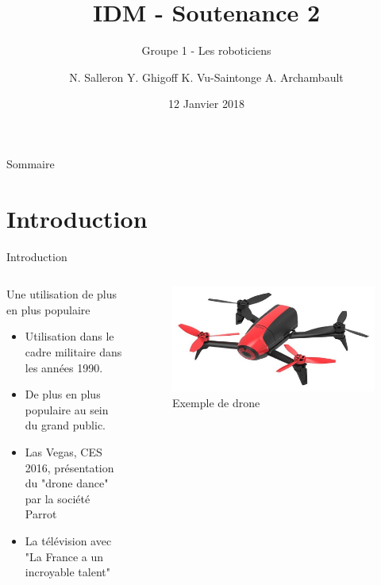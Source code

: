 \documentclass{bredelebeamer}
\title[Ingéniere dirigée par les Modéles]{IDM - Soutenance 2}
\subtitle{Groupe 1 - Les roboticiens}
\author{N. Salleron Y. Ghigoff K. Vu-Saintonge A. Archambault}
\date{12 Janvier 2018}
\begin{document}
\begin{frame}
  \titlepage
\end{frame}

\begin{frame}{Sommaire}
  \tableofcontents
\end{frame}

\section{Introduction}

\begin{frame}{Introduction}
\begin{columns}
\begin{column}{0.5\textwidth}
\begin{block}{Une utilisation de plus en plus populaire}
\begin{itemize}
\item Utilisation dans le cadre militaire dans les années 1990.
\item De plus en plus populaire au sein du grand public.
\item Las Vegas, CES 2016, présentation du "drone dance" par la société Parrot
\item La télévision avec "La France a un incroyable talent"
\end{itemize}
\end{block}
\end{column}
\begin{column}{0.5\textwidth}
\begin{figure}
\centering
\includegraphics[scale=0.15]{images/img1.jpg}
\caption{Exemple de drone}
\end{figure}
\end{column}
\end{columns}
\end{frame}
\end{document}
